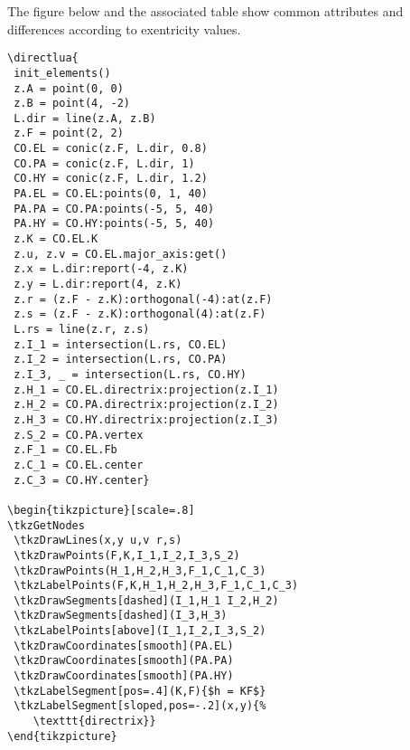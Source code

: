 The figure below and the associated table show common attributes and differences according to exentricity values.


\begin{verbatim}
\directlua{
 init_elements()
 z.A = point(0, 0)
 z.B = point(4, -2)
 L.dir = line(z.A, z.B)
 z.F = point(2, 2)
 CO.EL = conic(z.F, L.dir, 0.8)
 CO.PA = conic(z.F, L.dir, 1)
 CO.HY = conic(z.F, L.dir, 1.2)
 PA.EL = CO.EL:points(0, 1, 40)
 PA.PA = CO.PA:points(-5, 5, 40)
 PA.HY = CO.HY:points(-5, 5, 40)
 z.K = CO.EL.K
 z.u, z.v = CO.EL.major_axis:get()
 z.x = L.dir:report(-4, z.K)
 z.y = L.dir:report(4, z.K)
 z.r = (z.F - z.K):orthogonal(-4):at(z.F)
 z.s = (z.F - z.K):orthogonal(4):at(z.F)
 L.rs = line(z.r, z.s)
 z.I_1 = intersection(L.rs, CO.EL)
 z.I_2 = intersection(L.rs, CO.PA)
 z.I_3, _ = intersection(L.rs, CO.HY)
 z.H_1 = CO.EL.directrix:projection(z.I_1)
 z.H_2 = CO.PA.directrix:projection(z.I_2)
 z.H_3 = CO.HY.directrix:projection(z.I_3)
 z.S_2 = CO.PA.vertex
 z.F_1 = CO.EL.Fb
 z.C_1 = CO.EL.center
 z.C_3 = CO.HY.center}

\begin{tikzpicture}[scale=.8]
\tkzGetNodes
 \tkzDrawLines(x,y u,v r,s)
 \tkzDrawPoints(F,K,I_1,I_2,I_3,S_2)
 \tkzDrawPoints(H_1,H_2,H_3,F_1,C_1,C_3)
 \tkzLabelPoints(F,K,H_1,H_2,H_3,F_1,C_1,C_3)
 \tkzDrawSegments[dashed](I_1,H_1 I_2,H_2)
 \tkzDrawSegments[dashed](I_3,H_3)
 \tkzLabelPoints[above](I_1,I_2,I_3,S_2)
 \tkzDrawCoordinates[smooth](PA.EL)
 \tkzDrawCoordinates[smooth](PA.PA)
 \tkzDrawCoordinates[smooth](PA.HY)
 \tkzLabelSegment[pos=.4](K,F){$h = KF$}
 \tkzLabelSegment[sloped,pos=-.2](x,y){%
    \texttt{directrix}}
\end{tikzpicture}
\end{verbatim}



